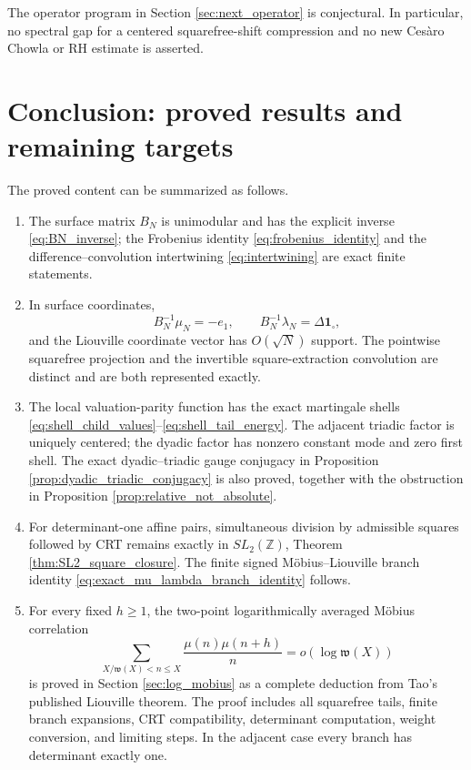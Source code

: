 \documentclass[11pt]{amsart}
\numberwithin{equation}{section}
\theoremstyle{plain}
\theoremstyle{definition}
\theoremstyle{remark}
\newcommand{\Z}{\mathbb Z}
\newcommand{\one}{\mathbf 1}
\newcommand{\mob}{\mu}
\newcommand{\liou}{\lambda}
\newcommand{\what}{\mathfrak w}
\begin{document}
The operator program in Section \ref{sec:next_operator} is conjectural.  In particular, no spectral gap for a centered squarefree-shift compression and no new Cesàro Chowla or RH estimate is asserted.

\section{Conclusion: proved results and remaining targets}
\label{sec:conclusion}

The proved content can be summarized as follows.

\begin{enumerate}[label=(\roman*)]
\item The surface matrix $B_N$ is unimodular and has the explicit inverse \eqref{eq:BN_inverse}; the Frobenius identity \eqref{eq:frobenius_identity} and the difference--convolution intertwining \eqref{eq:intertwining} are exact finite statements.

\item In surface coordinates,
\begin{equation}
B_N^{-1}\mob_N=-e_1,
\qquad
B_N^{-1}\liou_N=\Delta\one_{\square},
\label{eq:conclusion_mu_lambda_coords}
\end{equation}
and the Liouville coordinate vector has $O(\sqrt N)$ support.  The pointwise squarefree projection and the invertible square-extraction convolution are distinct and are both represented exactly.

\item The local valuation-parity function has the exact martingale shells \eqref{eq:shell_child_values}--\eqref{eq:shell_tail_energy}.  The adjacent triadic factor is uniquely centered; the dyadic factor has nonzero constant mode and zero first shell.  The exact dyadic--triadic gauge conjugacy in Proposition \ref{prop:dyadic_triadic_conjugacy} is also proved, together with the obstruction in Proposition \ref{prop:relative_not_absolute}.

\item For determinant-one affine pairs, simultaneous division by admissible squares followed by CRT remains exactly in $SL_2(\Z)$, Theorem \ref{thm:SL2_square_closure}.  The finite signed Möbius--Liouville branch identity \eqref{eq:exact_mu_lambda_branch_identity} follows.

\item For every fixed $h\ge1$, the two-point logarithmically averaged Möbius correlation
\begin{equation}
\sum_{X/\what(X)<n\le X}\frac{\mob(n)\mob(n+h)}n
=o(\log\what(X))
\label{eq:conclusion_log_mu}
\end{equation}
is proved in Section \ref{sec:log_mobius} as a complete deduction from Tao's published Liouville theorem.  The proof includes all squarefree tails, finite branch expansions, CRT compatibility, determinant computation, weight conversion, and limiting steps.  In the adjacent case every branch has determinant exactly one.
\end{enumerate}
\end{document}
